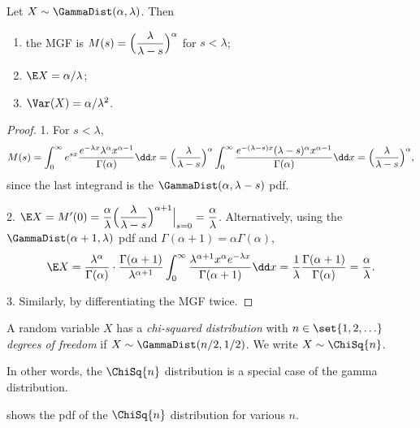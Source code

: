 \begin{theorem}\label{thm:gamma-properties}
Let $X \sim \GammaDist(\alpha, \lambda)$. Then
\begin{enumerate}
  \item the MGF is $M(s) = \Bigl(\dfrac{\lambda}{\lambda - s}\Bigr)^\alpha$ for $s < \lambda$;
  \item $\E X = \alpha/\lambda$;
  \item $\Var(X) = \alpha/\lambda^2$.
\end{enumerate}
\end{theorem}

\begin{proof}
1. For $s < \lambda$,
\[
  M(s) = \int_0^\infty e^{sx} \frac{e^{-\lambda x} \lambda^\alpha x^{\alpha - 1}}{\Gamma(\alpha)} \dd x = \Bigl(\frac{\lambda}{\lambda - s}\Bigr)^\alpha \int_0^\infty \frac{e^{-(\lambda - s)x} (\lambda - s)^\alpha x^{\alpha - 1}}{\Gamma(\alpha)} \dd x = \Bigl(\frac{\lambda}{\lambda - s}\Bigr)^\alpha,
\]
since the last integrand is the $\GammaDist(\alpha, \lambda - s)$ pdf.

2. $\E X = M'(0) = \dfrac{\alpha}{\lambda} \Bigl(\dfrac{\lambda}{\lambda - s}\Bigr)^{\alpha + 1}\Big|_{s=0} = \dfrac{\alpha}{\lambda}$. Alternatively, using the $\GammaDist(\alpha + 1, \lambda)$ pdf and $\Gamma(\alpha+1) = \alpha\Gamma(\alpha)$,
\[
  \E X = \frac{\lambda^\alpha}{\Gamma(\alpha)} \cdot \frac{\Gamma(\alpha + 1)}{\lambda^{\alpha + 1}} \int_0^\infty \frac{\lambda^{\alpha + 1} x^\alpha e^{-\lambda x}}{\Gamma(\alpha + 1)} \dd x = \frac{1}{\lambda} \frac{\Gamma(\alpha + 1)}{\Gamma(\alpha)} = \frac{\alpha}{\lambda}.
\]

3. Similarly, by differentiating the MGF twice.
\end{proof}

\begin{definition}\label{def:chi-squared}
A random variable $X$ has a \emph{chi-squared distribution} with $n \in \set{1, 2, \ldots}$ \emph{degrees of freedom} if $X \sim \GammaDist(n/2, 1/2)$. We write $X \sim \ChiSq{n}$.
\end{definition}

In other words, the $\ChiSq{n}$ distribution is a special case of the gamma distribution.

 shows the pdf of the $\ChiSq{n}$ distribution for various $n$.

